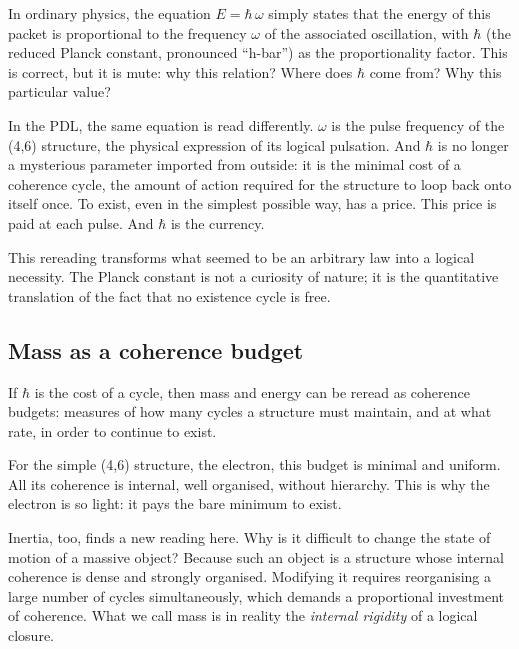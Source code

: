 \documentclass[12pt, a4paper, openright]{book}
\begin{document}
\medskip

In ordinary physics, the equation $E = \hbar\,\omega$ simply states that the energy of this packet is proportional to the frequency $\omega$ of the associated oscillation, with $\hbar$ (the reduced Planck constant, pronounced “h-bar”) as the proportionality factor. This is correct, but it is mute: why this relation? Where does $\hbar$ come from? Why this particular value?

\medskip

In the PDL, the same equation is read differently. $\omega$ is the pulse frequency of the (4,6) structure, the physical expression of its logical pulsation. And $\hbar$ is no longer a mysterious parameter imported from outside: it is the minimal cost of a coherence cycle, the amount of action required for the structure to loop back onto itself once. To exist, even in the simplest possible way, has a price. This price is paid at each pulse. And $\hbar$ is the currency.

\medskip

This rereading transforms what seemed to be an arbitrary law into a logical necessity. The Planck constant is not a curiosity of nature; it is the quantitative translation of the fact that no existence cycle is free.

\subsection*{Mass as a coherence budget}

If $\hbar$ is the cost of a cycle, then mass and energy can be reread as coherence budgets: measures of how many cycles a structure must maintain, and at what rate, in order to continue to exist.

\medskip

For the simple (4,6) structure, the electron, this budget is minimal and uniform. All its coherence is internal, well organised, without hierarchy. This is why the electron is so light: it pays the bare minimum to exist.

\medskip

Inertia, too, finds a new reading here. Why is it difficult to change the state of motion of a massive object? Because such an object is a structure whose internal coherence is dense and strongly organised. Modifying it requires reorganising a large number of cycles simultaneously, which demands a proportional investment of coherence. What we call mass is in reality the \emph{internal rigidity} of a logical closure.
\end{document}
